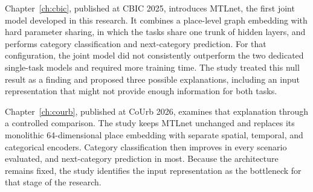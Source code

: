 Chapter~\ref{ch:cbic}, published at CBIC 2025, introduces MTLnet, the first joint model
developed in this research. It combines a place-level graph embedding with hard
parameter sharing, in which the tasks share one trunk of hidden layers, and performs category classification and next-category prediction. For that configuration, the joint model did not consistently outperform
the two dedicated single-task models and required more training time. The study
treated this null result as a finding and proposed three possible explanations,
including an input representation that might not provide enough information for both
tasks.

Chapter~\ref{ch:courb}, published at CoUrb 2026, examines that explanation through a
controlled comparison. The study keeps MTLnet unchanged and replaces its monolithic
64-dimensional place embedding with separate spatial, temporal, and categorical
encoders. Category classification then improves in every scenario evaluated, and
next-category prediction in most.
Because the architecture remains fixed, the study identifies the input representation
as the bottleneck for that stage of the research.


